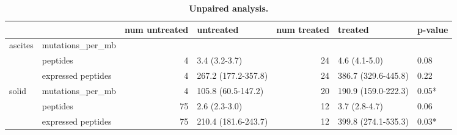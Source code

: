 \begin{table}
\label {tab:unpaired}

\begin{tabular}{llrlrll}
\toprule
        &                    &  num untreated &            untreated &  num treated &              treated &           p-value \\
\midrule
ascites & mutations\_per\_mb &                &                      &              &                      &                   \\
        & peptides &              4 &        3.4 (3.2-3.7) &           24 &        4.6 (4.1-5.0) &              0.08 \\
        & expressed peptides &              4 &  267.2 (177.2-357.8) &           24 &  386.7 (329.6-445.8) &              0.22 \\
solid & mutations\_per\_mb &              4 &   105.8 (60.5-147.2) &           20 &  190.9 (159.0-222.3) &             0.05* \\
        & peptides &             75 &        2.6 (2.3-3.0) &           12 &        3.7 (2.8-4.7) &              0.06 \\
        & expressed peptides &             75 &  210.4 (181.6-243.7) &           12 &  399.8 (274.1-535.3) &             0.03* \\
\bottomrule
\end{tabular}

\caption{\textbf{Unpaired analysis.}}
\end{table}


